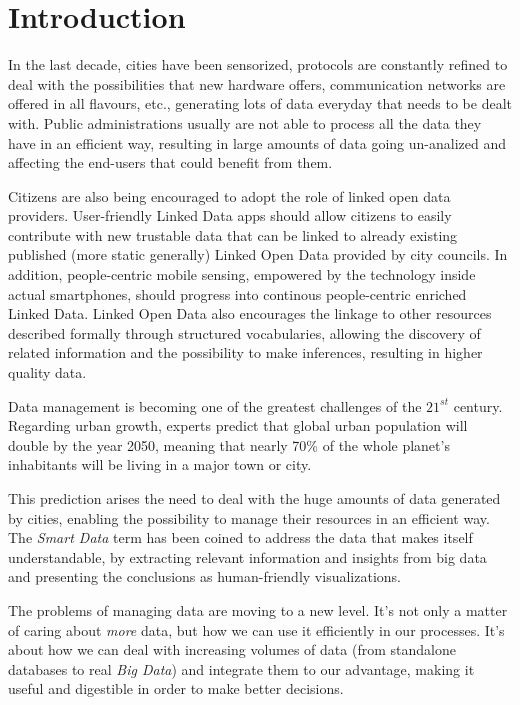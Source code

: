 \section{Introduction}

In the last decade, cities have been sensorized, protocols are constantly refined to deal with the possibilities that new hardware offers, communication networks are offered in all flavours, etc., generating lots of data everyday that needs to be dealt with. Public administrations usually are not able to process all the data they have in an efficient way, resulting in large amounts of data going un-analized and affecting the end-users that could benefit from them.

Citizens are also being encouraged to adopt the role of linked open data providers. User-friendly Linked Data apps should allow citizens to easily contribute with new trustable data that can be linked to already existing published (more static generally) Linked Open Data provided by city councils. In addition, people-centric mobile sensing, empowered by the technology inside actual smartphones, should progress into continous people-centric enriched Linked Data. Linked Open Data also encourages the linkage to other resources described formally through structured vocabularies, allowing the discovery of related information and the possibility to make inferences, resulting in higher quality data.

Data management is becoming one of the greatest challenges of the $21^{st}$ century. Regarding urban growth, experts predict that global urban population will double by the year 2050, meaning that nearly 70\% of the whole planet's inhabitants will be living in a major town or city.

This prediction arises the need to deal with the huge amounts of data generated by cities, enabling the possibility to manage their resources in an efficient way. The \textit{Smart Data} term has been coined to address the data that makes itself understandable, by extracting relevant information and insights from big data and presenting the conclusions as human-friendly visualizations.

The problems of managing data are moving to a new level. It's not only a matter of caring about \textit{more} data, but how we can use it efficiently in our processes. It's about how we can deal with increasing volumes of data (from standalone databases to real \textit{Big Data}) and integrate them to our advantage, making it useful and digestible in order to make better decisions.

